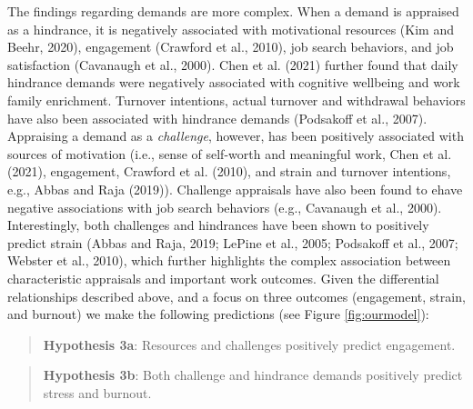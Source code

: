 \documentclass[
  man]{apa7}
\begin{document}
The findings regarding demands are more complex. When a demand is appraised as a hindrance, it is negatively associated with motivational resources (Kim and Beehr, 2020), engagement (Crawford et al., 2010), job search behaviors, and job satisfaction (Cavanaugh et al., 2000). Chen et al. (2021) further found that daily hindrance demands were negatively associated with cognitive wellbeing and work family enrichment. Turnover intentions, actual turnover and withdrawal behaviors have also been associated with hindrance demands (Podsakoff et al., 2007). Appraising a demand as a \emph{challenge}, however, has been positively associated with sources of motivation (i.e., sense of self-worth and meaningful work, Chen et al. (2021), engagement, Crawford et al. (2010), and strain and turnover intentions, e.g., Abbas and Raja (2019)). Challenge appraisals have also been found to ehave negative associations with job search behaviors (e.g., Cavanaugh et al., 2000). Interestingly, both challenges and hindrances have been shown to positively predict strain (Abbas and Raja, 2019; LePine et al., 2005; Podsakoff et al., 2007; Webster et al., 2010), which further highlights the complex association between characteristic appraisals and important work outcomes. Given the differential relationships described above, and a focus on three outcomes (engagement, strain, and burnout) we make the following predictions (see Figure \ref{fig:ourmodel}):

\begin{quote}
\textbf{Hypothesis 3a}: Resources and challenges positively predict engagement.
\end{quote}

\begin{quote}
\textbf{Hypothesis 3b}: Both challenge and hindrance demands positively predict stress and burnout.
\end{quote}
\end{document}
